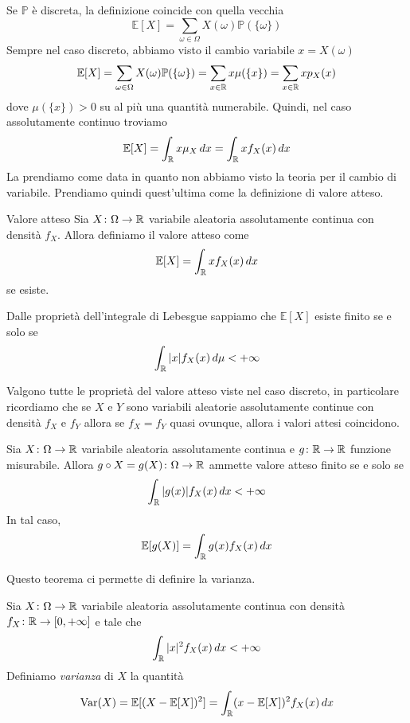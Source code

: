 \documentclass[a4paper]{article}
\begin{document}
Se \(\mathbb P\) è discreta, la definizione coincide con quella vecchia \[
    \mathbb E[X] = \sum_{\omega \in \Omega} X(\omega) \mathbb P(\{\omega\})
\]
Sempre nel caso discreto, abbiamo visto
il cambio variabile \(x = X(\omega)\) \[
    \mathbb E[X] = \sum_{\omega \in \Omega} X(\omega) \mathbb P(\{\omega\})
    = \sum_{x \in \mathbb{R}} x \mu(\{x\})
    = \sum_{x \in \mathbb{R}} x p_X(x)
\]
dove \(\mu(\{x\}) > 0\) su al più una quantità numerabile.
Quindi, nel caso assolutamente continuo troviamo
\begin{align*}
    \mathbb E[X] = \int_{\mathbb{R}} x\mu_X\,dx
    = \int_{\mathbb{R}} x f_X(x)\,dx
\end{align*}
La prendiamo come data in quanto non abbiamo visto la teoria per il cambio di variabile.
Prendiamo quindi quest'ultima come la definizione di valore atteso.

\begin{snippetdefinition}{Valore atteso}
    Sia \(X \colon \Omega \to \mathbb{R}\) variabile aleatoria assolutamente continua
    con densità \(f_X\).
    Allora definiamo il valore atteso come \[
        \mathbb E[X] = \int_{\mathbb{R}} xf_X(x)\,dx
    \]
    se esiste.
\end{snippetdefinition}

Dalle proprietà dell'integrale di Lebesgue sappiamo che \(\mathbb E[X]\)
esiste finito se e solo se \[
    \int_{\mathbb{R}} |x| f_X(x)\,d\mu < +\infty
\]

Valgono tutte le proprietà del valore atteso viste nel caso discreto,
in particolare ricordiamo che se \(X\) e \(Y\)
sono variabili aleatorie assolutamente continue con densità
\(f_X\) e \(f_Y\) allora se \(f_X = f_Y\) quasi ovunque, allora i valori attesi coincidono.

\begin{snippettheorem}{}
    Sia \(X \colon \Omega \to \mathbb{R}\) variabile aleatoria assolutamente continua e \(g \colon \mathbb{R} \to \mathbb{R}\)
    funzione misurabile. Allora \(g \circ X = g(X) \colon \Omega \to \mathbb{R}\)
    ammette valore atteso finito se e solo se \[
        \int_{\mathbb{R}} |g(x)| f_X(x)\,dx < +\infty
    \]
    In tal caso,
    \[
        \mathbb E[g(X)] = \int_{\mathbb{R}} g(x) f_X(x)\,dx
    \]
\end{snippettheorem}

Questo teorema ci permette di definire la varianza.

\begin{snippetdefinition}{}
    Sia \(X \colon \Omega \to \mathbb{R}\) variabile aleatoria assolutamente continua
    con densità \(f_X \colon \mathbb{R} \to [0,+\infty]\) e tale che
    \[
        \int_{\mathbb{R}} |x|^2 f_X(x)\,dx < +\infty
    \]
    Definiamo \emph{varianza} di \(X\) la quantità
    \[
        \operatorname{Var}(X)
        = \mathbb E[(X - \mathbb E[X])^2] = \int_{\mathbb{R}} (x - \mathbb E[X])^2 f_X(x)\,dx
    \]
\end{snippetdefinition}
\end{document}
